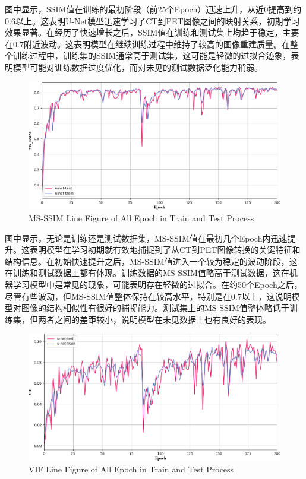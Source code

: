 \documentclass[twocolumn]{article}
\begin{document}
图中显示，SSIM值在训练的最初阶段（前25个Epoch）迅速上升，从近0提高到约0.6以上。这表明U-Net模型迅速学习了CT到PET图像之间的映射关系，初期学习效果显著。在经历了快速增长之后，SSIM值在训练和测试集上均趋于稳定，主要在0.7附近波动。这表明模型在继续训练过程中维持了较高的图像重建质量。在整个训练过程中，训练集的SSIM通常高于测试集，这可能是轻微的过拟合迹象，表明模型可能对训练数据过度优化，而对未见的测试数据泛化能力稍弱。

\begin{figure}[h]
    \centering
    \includegraphics[width=1.0\linewidth]{u-net/MS_SSIM}
    \caption[msssim]{MS-SSIM Line Figure of All Epoch in Train and Test Process}
    \label{fig:msssim}
\end{figure}

图中显示，无论是训练还是测试数据集，MS-SSIM值在最初几个Epoch内迅速提升。这表明模型在学习初期就有效地捕捉到了从CT到PET图像转换的关键特征和结构信息。在初始快速提升之后，MS-SSIM值进入一个较为稳定的波动阶段，这在训练和测试数据上都有体现。训练数据的MS-SSIM值略高于测试数据，这在机器学习模型中是常见的现象，可能表明存在轻微的过拟合。在约50个Epoch之后，尽管有些波动，但MS-SSIM值整体保持在较高水平，特别是在0.7以上，这说明模型对图像的结构相似性有很好的捕捉能力。测试集上的MS-SSIM值整体略低于训练集，但两者之间的差距较小，说明模型在未见数据上也有良好的表现。

\begin{figure}[h]
    \centering
    \includegraphics[width=1.0\linewidth]{u-net/VIF}
    \caption[vif]{VIF Line Figure of All Epoch in Train and Test Process}
    \label{fig:vif}
\end{figure}
\end{document}
